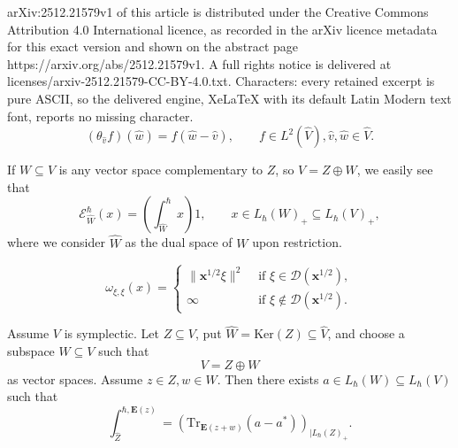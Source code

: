 \documentclass[10pt,a4paper]{amsart}
\def\msD{\mathscr D}
\newcommand{\Eb}{\mathbf{E}}
\newcommand{\Ker}{\mathrm{Ker}}
\newcommand{\Tr}{\mathrm{Tr}}
\newcommand{\eb}{\mathbf{E}}
\newcommand{\msE}{\mathscr{E}}
\begin{document}
arXiv:2512.21579v1 of this article is distributed under the Creative Commons Attribution 4.0 International licence, as recorded in the arXiv licence metadata for this exact version and shown on the abstract page https://arxiv.org/abs/2512.21579v1. A full rights notice is delivered at licenses/arxiv-2512.21579-CC-BY-4.0.txt. Characters: every retained excerpt is pure ASCII, so the delivered engine, XeLaTeX with its default Latin Modern text font, reports no missing character.
\begin{equation}\label{EqTransDual}
(\theta_{\hat{v}}f)(\hat{w}) = f(\hat{w}-\hat{v}),\qquad f\in L^2(\hat{V}),\hat{v},\hat{w}\in \hat{V}.
\end{equation}

\begin{remark}\label{RemWeight}
If $W \subseteq V$ is any vector space complementary to $Z$, so $V = Z\oplus W$, we easily see that 
\[
\msE_{\hat{W}}^{\hbar} (x) = \left(\int_{\hat{W}}^{\hbar}x\right)1,\qquad x\in L_{\hbar}(W)_+ \subseteq L_{\hbar}(V)_+,
\]
where we consider $\hat{W}$ as the dual space of $W$ upon restriction.
\end{remark} 

\begin{equation}\label{EqEqualFormPos}
\omega_{\xi,\xi}(x) = \begin{cases} \|\mathbf{x}^{1/2}\xi\|^2&\text{ if } \xi \in \msD(\mathbf{x}^{1/2}),\\
\infty &\text{ if } \xi \notin\msD(\mathbf{x}^{1/2}).
\end{cases}
\end{equation}

\begin{lemma}\label{LemInvWeightQT}
Assume $V$ is symplectic. Let $Z \subseteq V$, put $\hat{W} = \Ker(Z) \subseteq \hat{V}$, and choose a subspace $W \subseteq V$ such that
\[
V = Z\oplus W
\]
as vector spaces. Assume $z\in Z,w\in W$. Then there exists $a \in L_{\hbar}(W) \subseteq L_{\hbar}(V)$ such that  
\begin{equation}\label{EqFact}
\int_{\hat{Z}}^{\hbar,\eb(z)} =  \left(\Tr_{\Eb(z+w)}(a-a^*)\right)_{\mid L_{\hbar}(Z)_+}.
\end{equation}
\end{lemma} 
\end{document}
